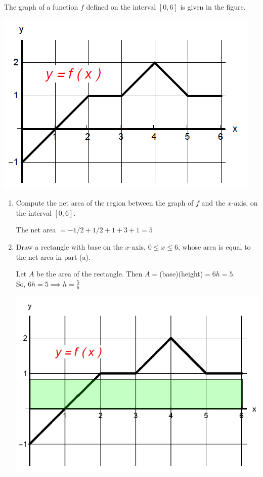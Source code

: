 \documentclass[nooutcomes]{ximera}
\begin{document}
\begin{problem}
 The graph of a function $f$ defined on the interval $[0,6]$  is given in the figure.
  
        \begin{image}
          \includegraphics[scale = 0.6]{Images/figure5.png}
        \end{image}
     \begin{enumerate}
     \item Compute the net area of the region between the graph of $f$ and the $x$-axis, on the interval $[0,6]$.
     \begin{freeResponse}
     The net area $= -1/2 + 1/2 +1 +3+1=5$
     \end{freeResponse}
        
     \item Draw a rectangle with base on the $x$-axis, $0\leq x \leq 6$, whose area is equal to the net area in part (a).
     \begin{freeResponse}
     Let $A$ be the area of the rectangle.  Then $A=$(base)(height)$=6h=5$.  \\
     So, $6h=5 \implies h=\frac{5}{6}$
            \begin{image}
          \includegraphics[scale = 0.5]{Images/figure6.png}
        \end{image}
     \end{freeResponse}
     

\end{enumerate}
\end{problem}
\end{document}
